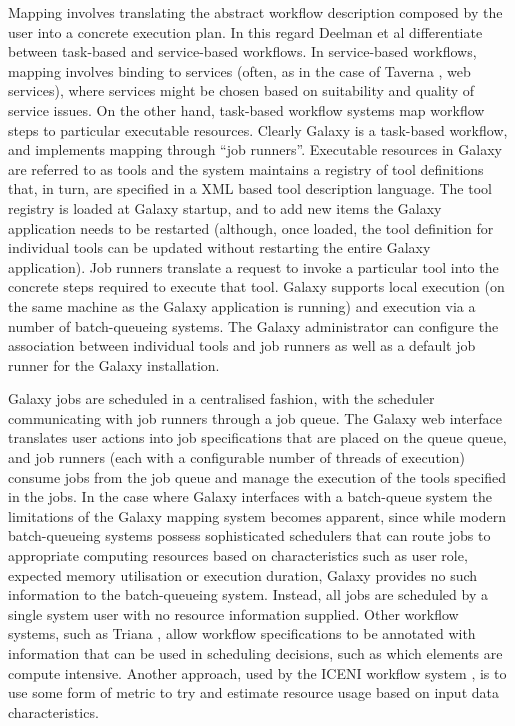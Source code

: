 \documentclass[a4paper,10pt]{scrreprt} \usepackage[utf8]{inputenc}
\begin{document}
Mapping involves translating the abstract workflow description composed by the user into a concrete execution plan. In this regard Deelman et al differentiate between task-based and service-based workflows. In service-based workflows, mapping involves binding to services (often, as in the case of Taverna \cite{hull_taverna:_2006}, web services), where services might be chosen based on suitability and quality of service issues. On the other hand, task-based workflow systems map workflow steps to particular executable resources. Clearly Galaxy is a task-based workflow, and implements mapping through ``job runners''. Executable resources in Galaxy are referred to as tools and the system maintains a registry of tool definitions that, in turn, are specified in a XML based tool description language. The tool registry is loaded at Galaxy startup, and to add new items the Galaxy application needs to be restarted (although, once loaded, the tool definition for individual tools can be updated without restarting the 
entire Galaxy application). Job runners translate a request to invoke a particular tool into the concrete steps required to execute that tool. Galaxy supports local execution (on the same machine as the Galaxy application is running) and execution via a number of batch-queueing systems. The Galaxy administrator can configure the association between individual tools and job runners as well as a default job runner for the Galaxy installation.

Galaxy jobs are scheduled in a centralised fashion, with the scheduler communicating with job runners through a job queue. The Galaxy web interface translates user actions into job specifications that are placed on the queue queue, and job runners (each with a configurable number of threads of execution) consume jobs from the job queue and manage the execution of the tools specified in the jobs. In the case where Galaxy interfaces with a batch-queue system the limitations of the Galaxy mapping system becomes apparent, since while modern batch-queueing systems possess sophisticated schedulers that can route jobs to appropriate computing resources based on characteristics such as user role, expected memory utilisation or execution duration, Galaxy provides no such information to the batch-queueing system. Instead, all jobs are scheduled by a single system user with no resource information supplied. Other workflow systems, such as Triana \cite{churches_programming_2006}, allow workflow specifications to be 
annotated with information that can be used in scheduling decisions, such as which elements are compute intensive. Another approach, used by the ICENI workflow system \cite{mcgough_workflow_2004}, is to use some form of metric to try and estimate resource usage based on input data characteristics.
\end{document}
